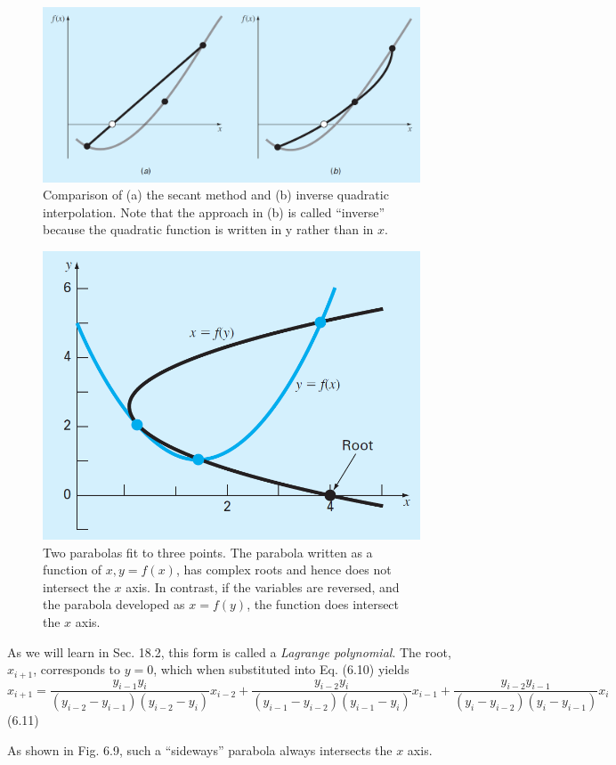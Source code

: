 \documentclass[../main.tex]{subfiles}
\begin{document}
\begin{figure}[h]
    \includegraphics[width=0.8\linewidth]{./images/fig_6_8}
    \caption{Comparison of (a) the secant method and (b) inverse quadratic interpolation. Note that the
    approach in (b) is called ``inverse'' because the quadratic function is written in y rather than in $x$.}
\end{figure}

\begin{figure}[h]
    \includegraphics[width=0.5\linewidth]{./images/fig_6_9}
    \caption{Two parabolas fit to three points. The parabola written as a function of $x, y = f(x)$, has complex
    roots and hence does not intersect the $x$ axis. In contrast, if the variables are reversed, and the
    parabola developed as $x = f (y)$, the function does intersect the $x$ axis.}
\end{figure}
\bigskip

\noindent As we will learn in Sec. 18.2, this form is called a \emph{Lagrange polynomial}. The root, $x_{i+1}$, corresponds
to $y = 0$, which when substituted into Eq. (6.10) yields\\

$x_{i+1}= \dfrac{y_{i-1}y_i}{(y_{i-2} - y_{i-1})(y_{i-2} - y_i)}x_{i-2}+
\dfrac{y_{i-2}y_i}{(y_{i-1} - y_{i-2})(y_{i-1} - y_i)}x_{i-1}+
\dfrac{y_{i-2}y_{i-1}}{(y_{i} - y_{i-2})(y_{i} - y_{i-1})}x_{i}$
\hfill (6.11)\\
\bigskip

\noindent As shown in Fig. 6.9, such a ``sideways'' parabola always intersects the $x$ axis.
\newpage
\end{document}
